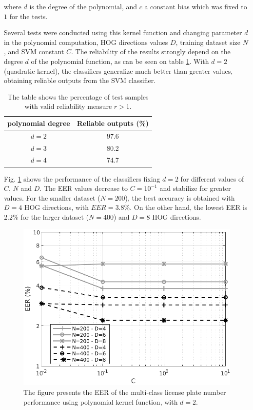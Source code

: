 \documentclass{ipol}
\begin{document}
\noindent where $d$ is the degree of the polynomial, and $c$ a constant bias which was fixed to $1$ for the tests.

Several tests were conducted using this kernel function and changing parameter $d$ in the polynomial computation, HOG directions values $D$, training dataset size $N$, and SVM constant $C$.
The reliability of the results strongly depend on the degree $d$ of the polynomial function, as can be seen on table \ref{tab:polRelMeasure}.
With $d=2$ (quadratic kernel), the classifiers generalize much better than greater values, obtaining reliable outputs from the SVM classifier.

\begin{table}[!htbp]
\small
	\begin{center}
		\begin{tabular}{c|c}
		{polynomial degree} & Reliable outputs (\%) \\
		\hline
		$d=2$ & 97.6 \\
		$d=3$ & 80.2 \\
		$d=4$ & 74.7 \\
		\hline
		\end{tabular}
		\caption{The table shows the percentage of test samples with valid reliability measure $r>1$.}
				\label{tab:polRelMeasure}
	\end{center}
\end{table}

Fig. \ref{fig:polRes} shows the performance of the classifiers fixing $d=2$ for different values of $C$, $N$ and $D$.
The EER values decrease to $C=10^{-1}$ and stabilize for greater values.
For the smaller dataset ($N=200$), the best accuracy is obtained with $D=4$ HOG directions, with $EER=3.8\%$.
On the other hand, the lowest EER is $2.2\%$ for the larger dataset ($N=400$) and $D=8$ HOG directions. 

\begin{figure}[!htbp]
	\begin{center}
			\includegraphics[width=.45\linewidth]{polynomial_results.pdf}
		\caption{The figure presents the EER of the multi-class license plate number performance using polynomial kernel function, with $d=2$.}
				\label{fig:polRes}
	\end{center}
\end{figure}
\end{document}
